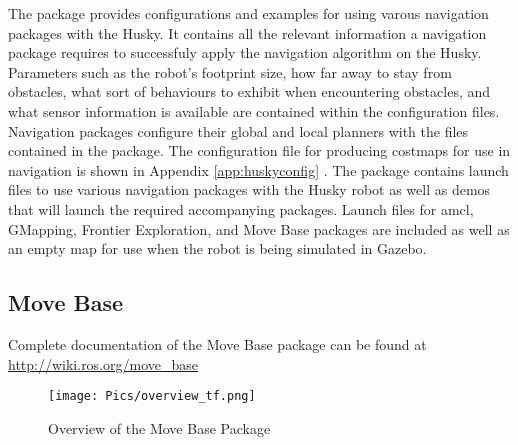The  package provides configurations and examples for using varous navigation packages with the Husky. It contains all the relevant information a navigation package requires to successfuly apply the navigation algorithm on the Husky. Parameters such as the robot's footprint size, how far away to stay from obstacles, what sort of behaviours to exhibit when encountering obstacles, and what sensor information is available are contained within the configuration files. Navigation packages configure their global and local planners with the files contained in the  package. The configuration file for producing costmaps for use in navigation is shown in Appendix \ref{app:huskyconfig} . The package contains launch files to use various navigation packages with the Husky robot as well as demos that will launch the required accompanying packages. Launch files for \acrshort{amcl}, GMapping, Frontier Exploration, and Move Base packages are included as well as an empty map for use when the robot is being simulated in Gazebo.\\ 

\subsection{Move Base}

Complete documentation of the Move Base package can be found at \url{http://wiki.ros.org/move_base}\\

\begin{figure}[H]
    \centering
    \texttt{[image: Pics/overview\_tf.png]}
    \caption{Overview of the Move Base Package \cite{rosmovebase}}
    \label{fig:movebaseoverview}
\end{figure}

